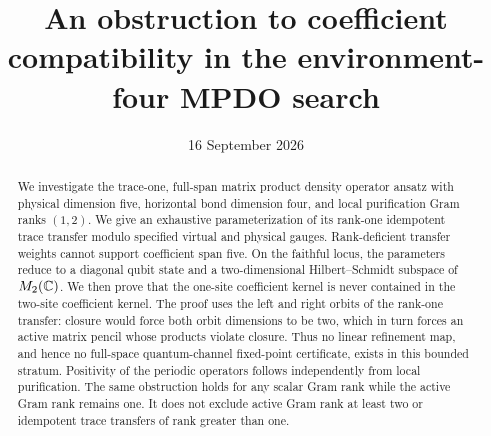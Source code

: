 \documentclass[aps,pra,reprint,nofootinbib,onecolumn]{revtex4-2}
\begin{document}
\title{An obstruction to coefficient compatibility in the environment-four MPDO search}
\date{16 September 2026}

\begin{abstract}
	We investigate the trace-one, full-span matrix product density operator
	ansatz with physical dimension five, horizontal bond dimension four,
	and local purification Gram ranks $(1,2)$. We give an exhaustive
	parameterization of its rank-one idempotent trace transfer modulo
	specified virtual and physical gauges. Rank-deficient transfer weights
	cannot support coefficient span five. On the faithful locus, the
	parameters reduce to a diagonal qubit state and a two-dimensional
	Hilbert--Schmidt subspace of $M_2(\mathbb{C})$. We then prove that the one-site
	coefficient kernel is never contained in the two-site coefficient
	kernel. The proof uses the left and right orbits of the rank-one
	transfer: closure would force both orbit dimensions to be two, which
	in turn forces an active matrix pencil whose products violate closure.
	Thus no linear refinement map, and hence no full-space quantum-channel
	fixed-point certificate, exists in this bounded stratum. Positivity
	of the periodic operators follows independently from local purification.
	The same obstruction holds for any scalar Gram rank while the active
	Gram rank remains one. It does not exclude active Gram rank at least two
	or idempotent trace transfers of rank greater than one.
\end{abstract}

\maketitle







\end{document}
